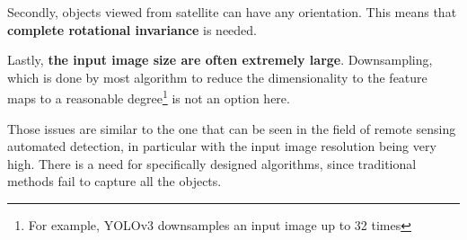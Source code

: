 Secondly, objects viewed from satellite can have any orientation. This means that \textbf{complete rotational invariance} is needed. 

Lastly, \textbf{the input image size are often extremely large}. Downsampling, which is done by most algorithm to reduce the dimensionality to the feature maps to a reasonable degree\footnote{For example, YOLOv3 downsamples an input image up to 32 times} is not an option here. 

Those issues are similar to the one that can be seen in the field of remote sensing automated detection, in particular with the input image resolution being very high. There is a need for specifically designed algorithms, since traditional methods fail to capture all the objects. 
